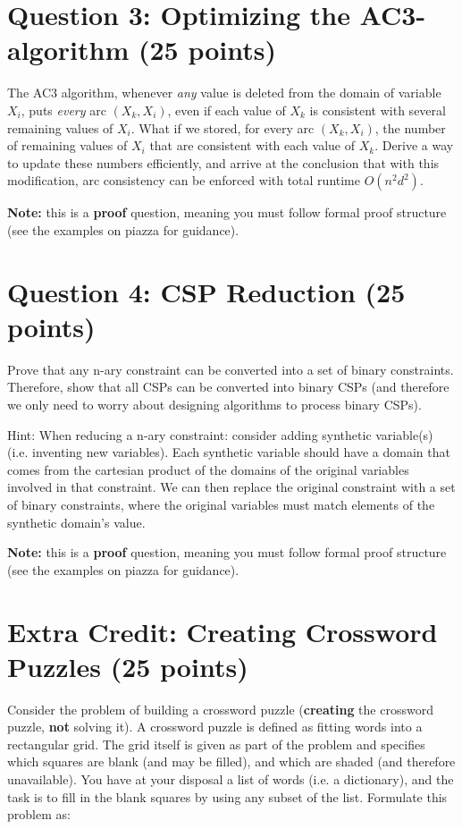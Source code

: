 \documentclass[11pt]{article}
\newcommand{\question}[1]{\section*{\normalsize #1}}
\begin{document}
\question{Question 3: Optimizing the AC3-algorithm (25 points)}
The AC3 algorithm, whenever \textit{any} value is deleted from the domain of variable $X_i$, puts \textit{every} arc $(X_k, X_i)$, even if each value of $X_k$ is consistent with several remaining values of $X_i$. What if we stored, for every arc $(X_k, X_i)$, the number of remaining values of $X_i$ that are consistent with each value of $X_k$. Derive a way to update these numbers efficiently, and arrive at the conclusion that with this modification, arc consistency can be enforced with total runtime $O(n^2d^2)$.\newline

\noindent\textbf{Note:} this is a \textbf{proof} question, meaning you must follow formal proof structure (see the examples on piazza for guidance).\newpage














\question{Question 4: CSP Reduction (25 points)}
Prove that any n-ary constraint can be converted into a set of binary constraints. Therefore, show that all CSPs can be converted into binary CSPs (and therefore we only need to worry about designing algorithms to process binary CSPs).\newline\newline\newline

\noindent Hint: When reducing a n-ary constraint: consider adding synthetic variable(s) (i.e. inventing new variables). Each synthetic variable should have a domain that comes from the cartesian product of the domains of the original variables involved in that constraint. We can then replace the original constraint with a set of binary constraints, where the original variables must match elements of the synthetic domain's value.\newline

\noindent\textbf{Note:} this is a \textbf{proof} question, meaning you must follow formal proof structure (see the examples on piazza for guidance).
\newpage







\question{Extra Credit: Creating Crossword Puzzles (25 points)}
Consider the problem of building a crossword puzzle (\textbf{creating} the crossword puzzle, \textbf{not} solving it). A crossword puzzle is defined as fitting words into a rectangular grid. The grid itself is given as part of the problem and specifies which squares are blank (and may be filled), and which are shaded (and therefore unavailable). You have at your disposal a list of words (i.e. a dictionary), and the task is to fill in the blank squares by using any subset of the list. Formulate this problem as:
\end{document}
